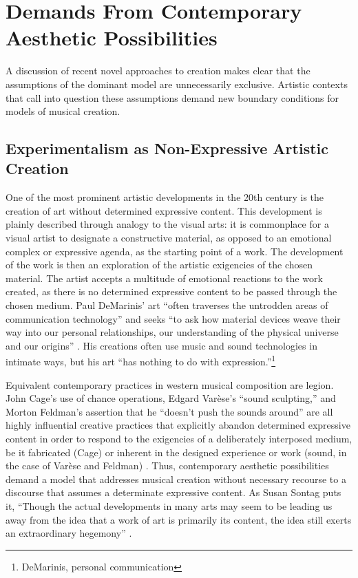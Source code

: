 \section{Demands From Contemporary Aesthetic Possibilities}
\label{Gurevich:sec:3}

A discussion of recent novel approaches to creation makes clear that the assumptions of the dominant model are unnecessarily exclusive. Artistic contexts that call into question these assumptions demand new boundary conditions for models of musical creation.

\subsection{Experimentalism as Non-Expressive Artistic Creation}
\label{Gurevich:sub:3_1}
One of the most prominent artistic developments in the 20th century is the creation of art without determined expressive content. This development is plainly described through analogy to the visual arts: it is commonplace for a visual artist to designate a constructive material, as opposed to an emotional complex or expressive agenda, as the starting point of a work. The development of the work is then an exploration of the artistic exigencies of the chosen material. The artist accepts a multitude of emotional reactions to the work created, as there is no determined expressive content to be passed through the chosen medium. Paul DeMarinis' art ``often traverses the untrodden areas of communication technology'' and seeks ``to ask how material devices weave their way into our personal relationships, our understanding of the physical universe and our origins'' \cite{DeMarinis:2004}. His creations often use music and sound technologies in intimate ways, but his art ``has nothing to do with expression.''\footnote{DeMarinis, personal communication}

Equivalent contemporary practices in western musical composition are legion. John Cage's use of chance operations, Edgard Var\`{e}se's ``sound sculpting,'' and Morton Feldman's assertion that he ``doesn't push the sounds around'' are all highly influential creative practices that explicitly abandon determined expressive content in order to respond to the exigencies of a deliberately interposed medium, be it fabricated (Cage) or inherent in the designed experience or work (sound, in the case of Var\`{e}se and Feldman) \cite{:2000a,:2006a,Cage:1961}. Thus, contemporary aesthetic possibilities demand a model that addresses musical creation without necessary recourse to a discourse that assumes a determinate expressive content. As Susan Sontag puts it, ``Though the actual developments in many arts may seem to be leading us away from the idea that a work of art is primarily its content, the idea still exerts an extraordinary hegemony'' \cite{Sontag:2001}.

